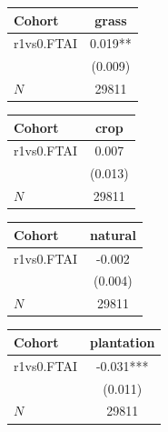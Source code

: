 {
\def\sym#1{\ifmmode^{#1}\else\(^{#1}\)\fi}
\begin{tabular}{l*{1}{c}}
\toprule
Cohort    &    grass   \\
\midrule
r1vs0.FTAI&    0.019** \\
          &  (0.009)   \\
\midrule
\(N\)     &    29811   \\
\bottomrule
\end{tabular}
}
{
\def\sym#1{\ifmmode^{#1}\else\(^{#1}\)\fi}
\begin{tabular}{l*{1}{c}}
\toprule
Cohort    &     crop   \\
\midrule
r1vs0.FTAI&    0.007   \\
          &  (0.013)   \\
\midrule
\(N\)     &    29811   \\
\bottomrule
\end{tabular}
}
{
\def\sym#1{\ifmmode^{#1}\else\(^{#1}\)\fi}
\begin{tabular}{l*{1}{c}}
\toprule
Cohort    &  natural   \\
\midrule
r1vs0.FTAI&   -0.002   \\
          &  (0.004)   \\
\midrule
\(N\)     &    29811   \\
\bottomrule
\end{tabular}
}
{
\def\sym#1{\ifmmode^{#1}\else\(^{#1}\)\fi}
\begin{tabular}{l*{1}{c}}
\toprule
Cohort    &plantation   \\
\midrule
r1vs0.FTAI&   -0.031***\\
          &  (0.011)   \\
\midrule
\(N\)     &    29811   \\
\bottomrule
\end{tabular}
}
